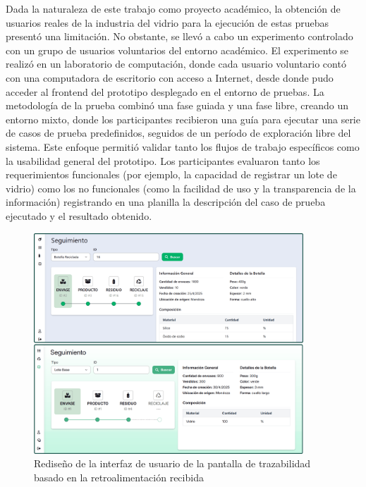 Dada la naturaleza de este trabajo como proyecto académico, la obtención de usuarios reales de la industria del vidrio para la ejecución de estas pruebas presentó una limitación. No obstante, se llevó a cabo un experimento controlado con un grupo de usuarios voluntarios del entorno académico. El experimento se realizó en un laboratorio de computación, donde cada usuario voluntario contó con una computadora de escritorio con acceso a Internet, desde donde pudo acceder al \gls{frontend} del prototipo desplegado en el entorno de pruebas. La metodología de la prueba combinó una fase guiada y una fase libre, creando un entorno mixto, donde los participantes recibieron una guía para ejecutar una serie de casos de prueba predefinidos, seguidos de un período de exploración libre del sistema. Este enfoque permitió validar tanto los flujos de trabajo específicos como la usabilidad general del prototipo. Los participantes evaluaron tanto los requerimientos funcionales (por ejemplo, la capacidad de registrar un lote de vidrio) como los no funcionales (como la facilidad de uso y la transparencia de la información) registrando en una planilla la descripción del caso de prueba ejecutado y el resultado obtenido.

\begin{figure}[!htb]
\centering
\includegraphics[width=0.9\textwidth]{Figures/uat-ui-redesign.png}
\caption{Rediseño de la interfaz de usuario de la pantalla de trazabilidad basado en la retroalimentación recibida}
\label{fig:uat-ui-redesign}
\end{figure}


